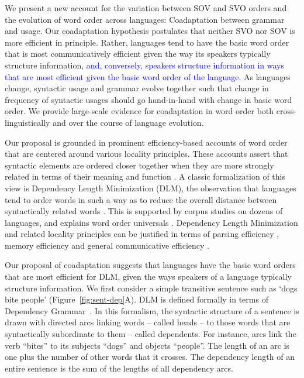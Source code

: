 \documentclass[9pt,twocolumn,twoside,lineno]{pnas-new}
\begin{document}
We present a new account for the variation between SOV and SVO orders and the evolution of word order across languages: Coadaptation between grammar and usage. Our coadaptation hypothesis postulates that neither SVO nor SOV is more efficient in principle.
Rather, languages tend to have the basic word order that is most communicatively efficient given the way its speakers typically structure information\textcolor{blue}{, and, conversely, speakers structure information in ways that are most efficient given the basic word order of the language.} As languages change, syntactic usage and grammar evolve together such that change in frequency of syntactic usages should go hand-in-hand with change in basic word order. We provide large-scale evidence for coadaptation in word order both cross-linguistically and over the course of language evolution.

Our proposal is grounded in prominent efficiency-based accounts of word order that are centered around various locality principles. These accounts assert that syntactic elements are ordered closer together when they are more strongly related in terms of their meaning and function \citep{behaghel1932deutsche,givon1985iconicity,rijkhoff-word-1986,hawkins-performance-1994}.
A classic formalization of this view is Dependency Length Minimization (DLM), the observation that languages tend to order words in such a way as to reduce the overall distance between syntactically related words \citep{rijkhoff-word-1986,hawkins-performance-1994,liu2008dependency,futrell-cross-linguistic-2015, liu-dependency-2017, futrell2020dependency}.
This is supported by corpus studies on dozens of languages, and explains word order universals \citep{rijkhoff-word-1986, hawkins-performance-1994, hahn2020universals}.
Dependency Length Minimization and related locality principles can be justified in terms of parsing efficiency \citep{hawkins-performance-1994}, memory efficiency \citep{gibson-linguistic-1998} and general communicative efficiency \citep{hahn2020universals}.




Our proposal of coadaptation suggests that languages have the basic word orders that are most efficient for DLM, given the ways speakers of a language typically structure information.
We first consider a simple transitive sentence such as `dogs bite people' (Figure~\ref{fig:sent-dep}A). 
DLM is defined formally in terms of Dependency Grammar~\citep{hays1964dependency,hudson1984word,melcuk1988dependency,corbett1993heads,tesniere2015elements}.
In this formalism, the syntactic structure of a sentence is drawn with directed arcs linking words -- called heads -- to those words that are syntactically subordinate to them -- called dependents.
For instance, arcs link the verb ``bites'' to its subjects ``dogs'' and objects ``people''.
The length of an arc is one plus the number of other words that it crosses.
The dependency length of an entire sentence is the sum of the lengths of all dependency arcs.
\end{document}
